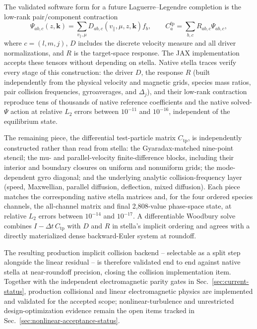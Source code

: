 \documentclass[11pt,a4paper]{article}
\begin{document}
The validated software form for a future Laguerre--Legendre completion is the
low-rank pair/component contraction
\begin{equation}
  \Psi_{ab,c}(z,\mathbf{k})
  = \sum_{v_\parallel,\mu}
    D_{ab,c}(v_\parallel,\mu,z,\mathbf{k}) f_b,
  \qquad
  C^{\mathrm{fp}}_a
  = \sum_{b,c} R_{ab,c}\Psi_{ab,c},
\end{equation}
where $c=(l,m,j)$, $D$ includes the discrete velocity measure and all driver
normalizations, and $R$ is the target-space response.  The JAX implementation
accepts these tensors without depending on stella.  Native stella traces
verify every stage of this construction: the driver $D$, the response $R$
(built independently from the physical velocity and magnetic grids, species
mass ratios, pair collision frequencies, gyroaverages, and $\Delta_j$), and
their low-rank contraction reproduce tens of thousands of native reference
coefficients and the native solved-$\Psi$ action at relative $L_2$ errors
between $10^{-11}$ and $10^{-16}$, independent of the equilibrium state.

The remaining piece, the differential test-particle matrix $C_{\mathrm{tp}}$,
is independently constructed rather than read from stella: the
Gyaradax-matched nine-point stencil; the mu- and parallel-velocity
finite-difference blocks, including their interior and boundary closures on
uniform and nonuniform grids; the mode-dependent gyro diagonal; and the
underlying analytic collision-frequency layer (speed, Maxwellian, parallel
diffusion, deflection, mixed diffusion).  Each piece matches the corresponding
native stella matrices and, for the four ordered species channels, the
all-channel matrix and final 2,808-value phase-space state, at relative $L_2$
errors between $10^{-14}$ and $10^{-17}$.  A differentiable Woodbury solve
combines $I-\Delta t\,C_{\mathrm{tp}}$ with $D$ and $R$ in stella's implicit
ordering and agrees with a directly materialized dense backward-Euler system
at roundoff.

The resulting production implicit collision backend -- selectable as a split
step alongside the linear residual -- is therefore validated end to end
against native stella at near-roundoff precision, closing the collision
implementation item.  Together with the independent electromagnetic parity
gates in Sec.~\ref{sec:current-status}, production collisional and linear
electromagnetic physics are implemented and validated for the accepted scope;
nonlinear-turbulence and unrestricted design-optimization evidence remain the
open items tracked in Sec.~\ref{sec:nonlinear-acceptance-status}.
\end{document}
